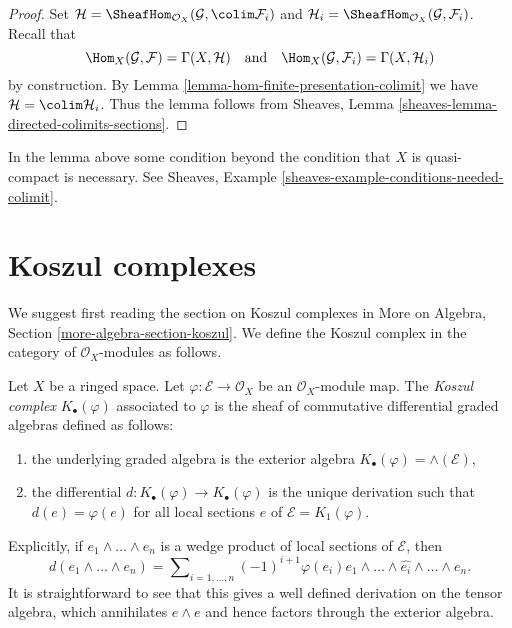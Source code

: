 \begin{proof}
Set
$\mathcal{H} = \SheafHom_{\mathcal{O}_X}(\mathcal{G}, \colim \mathcal{F}_i)$
and $\mathcal{H}_i = \SheafHom_{\mathcal{O}_X}(\mathcal{G}, \mathcal{F}_i)$.
Recall that
$$
\Hom_X(\mathcal{G}, \mathcal{F}) = \Gamma(X, \mathcal{H})
\quad\text{and}\quad
\Hom_X(\mathcal{G}, \mathcal{F}_i) = \Gamma(X, \mathcal{H}_i)
$$
by construction. By Lemma \ref{lemma-hom-finite-presentation-colimit} we have
$\mathcal{H} = \colim \mathcal{H}_i$. Thus the lemma follows from
Sheaves, Lemma \ref{sheaves-lemma-directed-colimits-sections}.
\end{proof}

\begin{remark}
\label{remark-condition-necessary}
In the lemma above some condition beyond the condition that $X$
is quasi-compact is necessary. See
Sheaves, Example \ref{sheaves-example-conditions-needed-colimit}.
\end{remark}





\section{Koszul complexes}
\label{section-koszul-complex}

\noindent
We suggest first reading the section on Koszul complexes in
More on Algebra, Section \ref{more-algebra-section-koszul}.
We define the Koszul complex in the category of $\mathcal{O}_X$-modules
as follows.

\begin{definition}
\label{definition-koszul}
Let $X$ be a ringed space. Let $\varphi : \mathcal{E} \to \mathcal{O}_X$
be an $\mathcal{O}_X$-module map. The
{\it Koszul complex} $K_\bullet(\varphi)$ associated to $\varphi$
is the sheaf of commutative differential graded algebras defined as follows:
\begin{enumerate}
\item the underlying graded algebra is the exterior algebra
$K_\bullet(\varphi) = \wedge(\mathcal{E})$,
\item the differential $d : K_\bullet(\varphi) \to K_\bullet(\varphi)$
is the unique derivation such that $d(e) = \varphi(e)$ for all
local sections $e$ of $\mathcal{E} = K_1(\varphi)$.
\end{enumerate}
\end{definition}

\noindent
Explicitly, if $e_1 \wedge \ldots \wedge e_n$ is a wedge product of local
sections of $\mathcal{E}$, then
$$
d(e_1 \wedge \ldots \wedge e_n) =
\sum\nolimits_{i = 1, \ldots, n} (-1)^{i + 1}
\varphi(e_i)e_1 \wedge \ldots \wedge \widehat{e_i} \wedge \ldots \wedge e_n.
$$
It is straightforward to see that this gives a well defined derivation
on the tensor algebra, which annihilates $e \wedge e$ and hence factors
through the exterior algebra.

